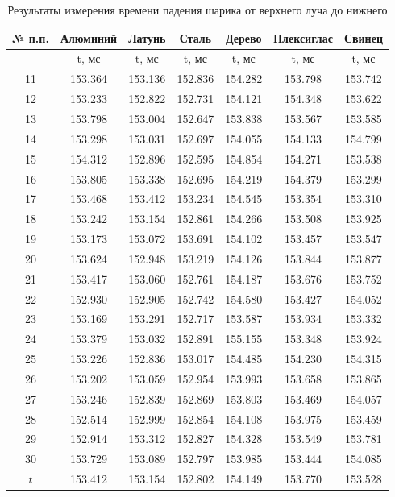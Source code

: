 \begin{center}
\begin{table}[H]
\centering
\caption{Результаты измерения времени падения шарика от верхнего луча до нижнего}

\label{table:t1}
\begin{tabular}{|c|c|c|c|c|c|c|}
\hline

№ п.п. &Алюминий&Латунь&Сталь&Дерево&Плексиглас&Свинец\\
\hline
{}&t, мс&t, мс&t, мс&t, мс&t, мс&t, мс\\
\hline
11 & 153.364 & 153.136 & 152.836 & 154.282 & 153.798 & 153.742 \\
12 & 153.233 & 152.822 & 152.731 & 154.121 & 154.348 & 153.622 \\
13 & 153.798 & 153.004 & 152.647 & 153.838 & 153.567 & 153.585 \\
14 & 153.298 & 153.031 & 152.697 & 154.055 & 154.133 & 154.799 \\
15 & 154.312 & 152.896 & 152.595 & 154.854 & 154.271 & 153.538 \\
16 & 153.805 & 153.338 & 152.695 & 154.219 & 154.379 & 153.299 \\
17 & 153.468 & 153.412 & 153.234 & 154.545 & 153.354 & 153.310 \\
18 & 153.242 & 153.154 & 152.861 & 154.266 & 153.508 & 153.925 \\
19 & 153.173 & 153.072 & 153.691 & 154.102 & 153.457 & 153.547 \\
20 & 153.624 & 152.948 & 153.219 & 154.126 & 153.844 & 153.877 \\
21 & 153.417 & 153.060 & 152.761 & 154.187 & 153.676 & 153.752 \\
22 & 152.930 & 152.905 & 152.742 & 154.580 & 153.427 & 154.052 \\
23 & 153.169 & 153.291 & 152.717 & 153.587 & 153.934 & 153.332 \\
24 & 153.379 & 153.032 & 152.891 & 155.155 & 153.348 & 153.924 \\
25 & 153.226 & 152.836 & 153.017 & 154.485 & 154.230 & 154.315 \\
26 & 153.202 & 153.059 & 152.954 & 153.993 & 153.658 & 153.865 \\
27 & 153.246 & 152.839 & 152.869 & 153.803 & 153.469 & 154.057 \\
28 & 152.514 & 152.999 & 152.854 & 154.108 & 153.975 & 153.459 \\
29 & 152.914 & 153.312 & 152.827 & 154.328 & 153.549 & 153.781 \\
30 & 153.729 & 153.089 & 152.797 & 153.985 & 153.444 & 154.085 \\
\hline
$\overline{t}$ & 153.412 &  153.154 & 152.802 & 154.149& 153.770 & 153.528 \\
\hline
\end{tabular}
\end{table}
\end{center}
